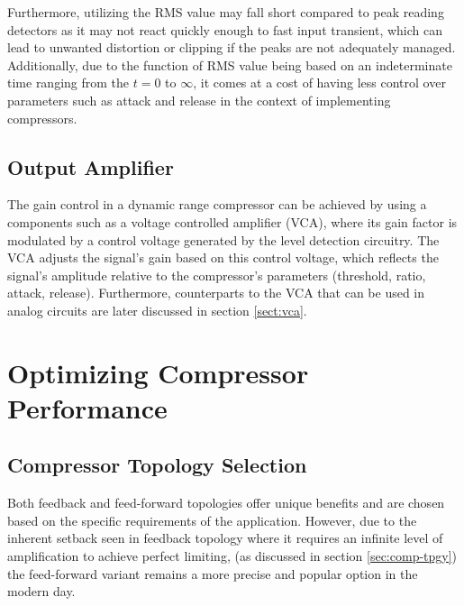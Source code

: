 \documentclass[10pt]{article}
\begin{document}
\begin{multicols*}{2}
                     

                    Furthermore, utilizing the RMS value may fall short compared to peak reading detectors as it may not react quickly enough to fast input transient, which can lead to unwanted distortion or clipping if the peaks are not adequately managed. Additionally, due to the function of RMS value being based on an indeterminate time ranging from the $t=0$ to $\infty$, it comes at a cost of having less control over parameters such as attack and release in the context of implementing compressors.

            \subsection{Output Amplifier}
                The gain control in a dynamic range compressor can be achieved by using a components such as a voltage controlled amplifier (VCA),  where its gain factor is modulated by a control voltage generated by the level detection circuitry. The VCA adjusts the signal's gain based on this control voltage, which reflects the signal's amplitude relative to the compressor's parameters (threshold, ratio, attack, release). Furthermore, counterparts to the VCA that can be used in analog circuits are later discussed in section \ref{sect:vca}.
        


        \section[Optimizing Compressor Performance]{Optimizing Compressor\\Performance}
            
            \subsection{Compressor Topology Selection}
                Both feedback and feed-forward topologies offer unique benefits and are chosen based on the specific requirements of the application. However, due to the inherent setback seen in feedback topology where it requires an infinite level of amplification to achieve perfect limiting, (as discussed in section \ref{sec:comp-tpgy}) the feed-forward variant remains a more precise and popular option in the modern day.\par

\end{multicols*}
\end{document}
